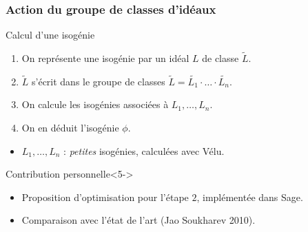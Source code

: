 \documentclass[11pt]{beamer}
\begin{document}
	\begin{frame}
		\frametitle{Action du groupe de classes d'idéaux}
		\begin{block}{Calcul d'une isogénie}
			\begin{enumerate}
				\item On représente une isogénie par un idéal $L$ de classe $\tilde{L}$.
				\item<2-> $\tilde{L}$ s'écrit dans le groupe de classes $\tilde{L} = \tilde{L_1}\cdot\ldots\cdot\tilde{L_n}$.
				\item<3-> On calcule les isogénies associées à $L_1, \ldots, L_n$.
				\item<4-> On en déduit l'isogénie $\phi$.
			\end{enumerate}
		\end{block}
		\begin{itemize}
			\item<4-> $L_1,\ldots,L_n$ : \textit{petites} isogénies, calculées avec Vélu. 
		\end{itemize}
		
		\begin{block}{Contribution personnelle}<5->
			\begin{itemize}
				\item Proposition d'optimisation pour l'étape $2$, implémentée dans Sage. 
				\item Comparaison avec l'état de l'art (Jao Soukharev 2010).
			\end{itemize}
		
		\end{block}
	
	\end{frame}
	
\end{document}

